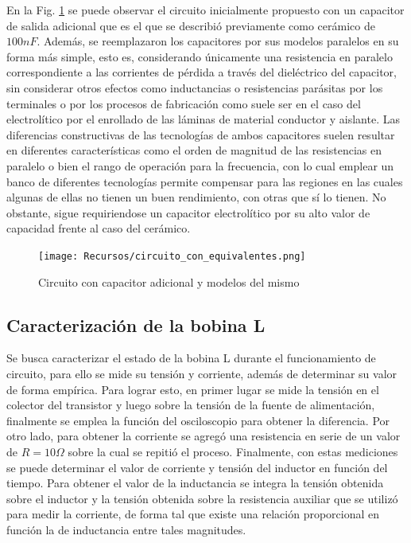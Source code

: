 En la Fig. \ref{fig:circuito_equivalente} se puede observar el circuito inicialmente propuesto con un capacitor de salida adicional que es el que se describi\'o previamente como cer\'amico de $100nF$. Adem\'as,
se reemplazaron los capacitores por sus modelos paralelos en su forma m\'as simple, esto es, considerando \'unicamente una resistencia en paralelo correspondiente a las corrientes de p\'erdida a trav\'es del diel\'ectrico del capacitor,
sin considerar otros efectos como inductancias o resistencias par\'asitas por los terminales o por los procesos de fabricaci\'on como suele ser en el caso del electrol\'itico por el enrollado de las l\'aminas de material conductor y aislante.
Las diferencias constructivas de las tecnolog\'ias de ambos capacitores suelen resultar en diferentes caracter\'isticas como el orden de magnitud de las resistencias en paralelo o bien el rango de operaci\'on para la frecuencia, con lo cual
emplear un banco de diferentes tecnolog\'ias permite compensar para las regiones en las cuales algunas de ellas no tienen un buen rendimiento, con otras que s\'i lo tienen. No obstante, sigue requiriendose un capacitor electrol\'itico por su alto valor de capacidad
frente al caso del cer\'amico.

\begin{figure}[H]
    \centering
    \texttt{[image: Recursos/circuito\_con\_equivalentes.png]}
    \caption{Circuito con capacitor adicional y modelos del mismo}
    \label{fig:circuito_equivalente}
\end{figure}

\subsection{Caracterizaci\'on de la bobina L}
Se busca caracterizar el estado de la bobina L durante el funcionamiento de circuito, para ello se mide su tensi\'on y corriente, adem\'as de determinar su valor de forma emp\'irica. Para lograr esto,
en primer lugar se mide la tensi\'on en el colector del transistor y luego sobre la tensi\'on de la fuente de alimentaci\'on, finalmente se emplea la funci\'on del osciloscopio para obtener la diferencia.
Por otro lado, para obtener la corriente se agreg\'o una resistencia en serie de un valor de $R = 10\Omega$ sobre la cual se repiti\'o el proceso.
Finalmente, con estas mediciones se puede determinar el valor de corriente y tensi\'on del inductor en funci\'on del tiempo. Para obtener el valor de la inductancia se integra la tensi\'on obtenida sobre el inductor
y la tensi\'on obtenida sobre la resistencia auxiliar que se utiliz\'o para medir la corriente, de forma tal que existe una relaci\'on proporcional en funci\'on la de inductancia entre tales magnitudes.

